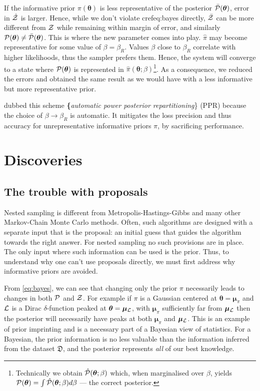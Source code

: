 \documentclass[draft,usenatbib]{mnras}
\begin{document}
If the informative prior \(\pi (\bm{\theta})\) is less
representative of the posterior \(\bar{\cal P} (\bm{\theta})\),
error in \(\hat{\cal Z}\) is larger. Hence, while we don't violate
crefeq:bayes directly, \(\bar{\cal Z}\) can be more different from
\({\cal Z}\) while remaining within margin of error, and similarly
\({\cal P}(\bm{\theta}) \ne \bar{\cal P}(\bm{\theta})\). This is
where the new parameter comes into play. \(\hat{\pi}\) may become
representative for some value of \(\beta = \beta_{R}\). Values
\(\beta\) close to \(\beta_{R}\) correlate with higher likelihoods,
thus the sampler prefers them. Hence, the system will converge to a
state where \({\cal P} (\bm{\theta})\) is represented in
\(\hat{\pi} (\bm{\theta};\beta)\)\footnote{Technically we obtain \(\hat{\cal P} (\bm{\theta};\beta)\) which, when marginalised over
\(\beta\), yields \({\cal P} (\bm{\theta}) = \int \hat{\cal P}
   (\bm{\theta};\beta) d \beta\) --- the correct posterior.}.  As a
consequence, we reduced the errors and obtained the same result as
we would have with a less informative but more representative
prior.

\cite{chen-ferroz-hobson} dubbed this scheme
\textbf\{\emph{automatic power posterior repartitioning}\} (PPR)
because the choice of \(\beta\rightarrow\beta_{R}\) is automatic. It
mitigates the loss precision and thus accuracy for unrepresentative
informative priors \(\pi\), by sacrificing performance.

\section{Discoveries}
\label{sec:org85f6b5d}

\subsection{The trouble with proposals}
\label{sec:org8bc2bd5}

Nested sampling is different from Metropolis-Hastings-Gibbs and
many other Markov-Chain Monte Carlo methods. Often, such algorithms
are designed with a separate input that is the proposal: an initial
guess that guides the algorithm towards the right answer.  For
nested sampling no such provisions are in place. The only input
where such information can be used is the prior.  Thus, to
understand why one can't use proposals directly, we must first
address why informative priors are avoided.

From \cref{eq:bayes}, we can see that changing only the prior \(\pi\)
necessarily leads to changes in both \({\cal P}\) and \({\cal Z}\). For
example if \(\pi\) is a Gaussian centered at
\(\bm{\theta}=\bm{\mu}_{\pi}\) and \({\cal L}\) is a Dirac
\(\delta\)-function peaked at \(\bm{\theta}=\bm{\mu}_{{\cal L}}\), with
\(\bm{\mu}_{\pi}\) sufficiently far from \(\bm{\mu}_{{\cal L}}\) then
the posterior will necessarily have peaks at both \(\bm{\mu}_{\pi}\)
and \(\bm{\mu}_{{\cal L}}\). This is an example of prior imprinting
and is a necessary part of a Bayesian view of statistics. For a
Bayesian, the prior information is no less valuable than the
information inferred from the dataset \(\mathfrak{D}\), and the
posterior represents \emph{all} of our best knowledge.
\end{document}
